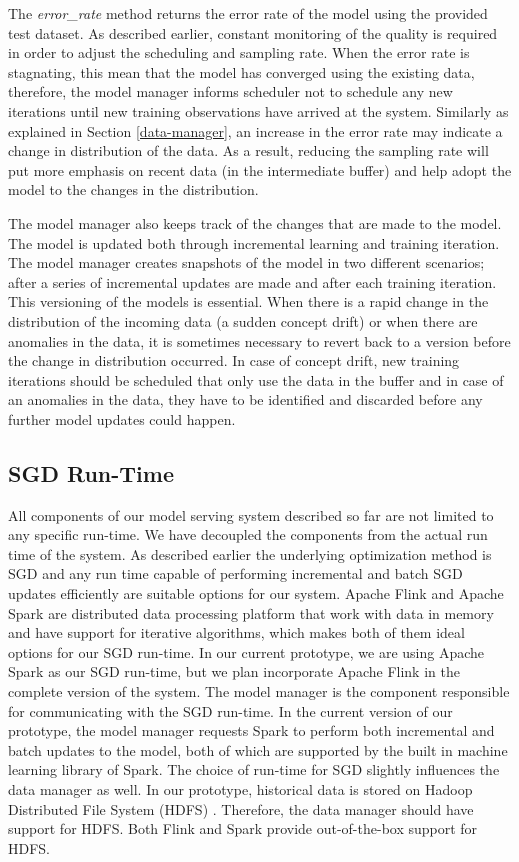\documentclass{vldb}
\begin{document}
The \textit{error\_rate} method returns the error rate of the model using the provided test dataset.
As described earlier, constant monitoring of the quality is required in order to adjust the scheduling and sampling rate.
When the error rate is stagnating, this mean that the model has converged using the existing data, therefore, the model manager informs scheduler not to schedule any new iterations until new training observations have arrived at the system.
Similarly as explained in Section \ref{data-manager}, an increase in the error rate may indicate a change in distribution of the data.
As a result, reducing the sampling rate will put more emphasis on recent data (in the intermediate buffer) and help adopt the model to the changes in the distribution.

The model manager also keeps track of the changes that are made to the model.
The model is updated both through incremental learning and training iteration.
The model manager creates snapshots of the model in two different scenarios; after a series of incremental updates are made and after each training iteration.
This versioning of the models is essential.
When there is a rapid change in the distribution of the incoming data (a sudden concept drift) or when there are anomalies in the data, it is sometimes necessary to revert back to a version before the change in distribution occurred.
In case of concept drift, new training iterations should be scheduled that only use the data in the buffer and in case of an anomalies in the data, they have to be identified and discarded before any further model updates could happen.

\subsection{SGD Run-Time} 
All components of our model serving system described so far are not limited to any specific run-time.
We have decoupled the components from the actual run time of the system.
As described earlier the underlying optimization method is SGD and any run time capable of performing incremental and batch SGD updates efficiently are suitable options for our system.
Apache Flink \cite{carbone2015apache} and Apache Spark \cite{zaharia2010spark} are distributed data processing platform that work with data in memory and have support for iterative algorithms, which makes both of them ideal options for our SGD run-time.
In our current prototype, we are using Apache Spark \cite{zaharia2010spark} as our SGD run-time, but we plan incorporate Apache Flink in the complete version of the system.
The model manager is the component responsible for communicating with the SGD run-time.
In the current version of our prototype, the model manager requests Spark to perform both incremental and batch updates to the model, both of which are supported by the built in machine learning library of Spark.
The choice of run-time for SGD slightly influences the data manager as well.
In our prototype, historical data is stored on Hadoop Distributed File System (HDFS) \cite{shvachko2010hadoop}.
Therefore, the data manager should have support for HDFS.
Both Flink and Spark provide out-of-the-box support for HDFS.
\end{document}

